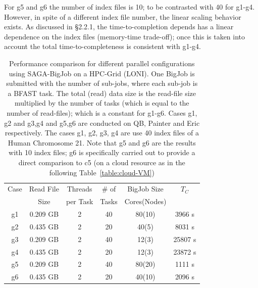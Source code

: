 \documentclass{cpeauth}
\begin{document}
For g5 and g6 the number of index files is 10; to be contrasted with
40 for g1-g4.  However, in spite of a different index file number, the
linear scaling behavior exists.  As discussed in \S 2.2.1, the
time-to-completion depends has a linear dependence on the index files
(memory-time trade-off); once this is taken into account the total
time-to-completeness is consistent with g1-g4.


 \begin{table}
 \small
 \begin{tabular}{|c|c|c|c|c|c|} 
 \hline 
Case & Read File & Threads   &  \# of & BigJob Size   &   $T_C$   \\
   & Size& per Task & Tasks  & Cores(Nodes)  & \\
   \hline
g1 & 0.209 GB & 2 &   40 &  80(10) & 3966 s \\
g2 & 0.435 GB & 2 &  20 & 40(5) & 8031 s\\ \hline
g3  & 0.209 GB& 2 & 40  & 12(3) & 25807 s \\
g4 & 0.435 GB& 2 & 20  & 12(3) & 23872 s  \\ \hline
\hline
g5 & 0.209 GB& 2& 40 & 80(20) & 1111 s \\
g6&0.435 GB&2& 20 & 40(10)&2096 s\\
\hline
\end{tabular}
\caption{Performance comparison for different parallel configurations
  using SAGA-BigJob on a HPC-Grid (LONI). One BigJob is submitted with
  the number of sub-jobs, where each sub-job is a BFAST task.  The
  total (read) data size is the read-file size multiplied by the
  number of tasks (which is equal to the number of read-files); which
  is a constant for g1-g6.  Cases g1, g2 and g3,g4 and g5,g6 are
  conducted on QB, Painter and Eric respectively. The cases g1, g2,
  g3, g4 are use 40 index files of a Human Chromosome 21.  Note that
  g5 and g6 are the results with 10 index files; g6 is specifically
  carried out to provide a direct comparison to c5 (on a cloud
  resource as in the following Table~\ref{table:cloud-VM}) }
  
  \label{table:bigjob-loni} 
\end{table}

\end{document}
